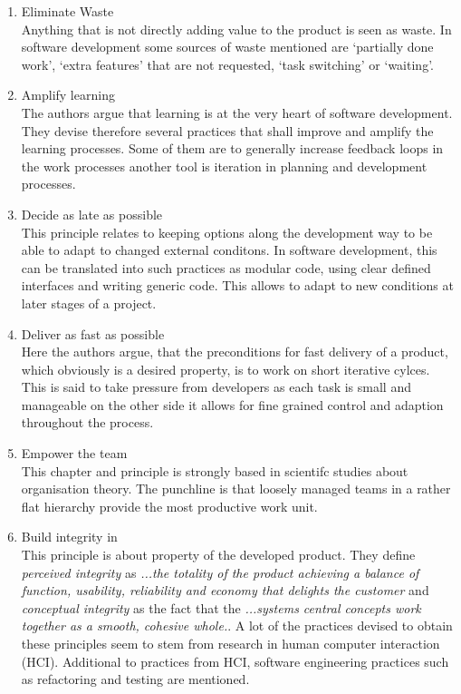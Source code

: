 \documentclass[a4paper,11pt,twoside]{article}
\begin{document}
\begin{enumerate}
\item Eliminate Waste\\
Anything that is not directly adding value to the product is seen as waste. In software development some sources of waste mentioned are `partially done work', `extra features' that are not requested, `task switching' or `waiting'. 

\item Amplify learning\\
The authors argue that learning is at the very heart of software development. They devise therefore several practices that shall improve and amplify the learning processes. Some of them are to generally increase feedback loops in the work processes another tool is iteration in planning and development processes. 

\item Decide as late as possible\\
This principle relates to keeping options along the development way to be able to adapt to changed external conditons. In software development, this can be translated into such practices as modular code, using clear defined interfaces and writing generic code. This allows to adapt to new conditions at later stages of a project.

\item Deliver as fast as possible\\
Here the authors argue, that the preconditions for fast delivery of a product, which obviously is a desired property, is to work on short iterative cylces. This is said to take pressure from developers as each task is small and manageable on the other side it allows for fine grained control and adaption throughout the process.

\item Empower the team\\
This chapter and principle is strongly based in scientifc studies about organisation theory. The punchline is that loosely managed teams in a rather flat hierarchy provide the most productive work unit.  

\item Build integrity in\\
This principle is about property of the developed product. They define \textit{perceived integrity} as \textit{...the totality of the product achieving a balance of function, usability, reliability and economy that delights the customer} and \textit{conceptual integrity} as the fact that the \textit{...systems central concepts work together as a smooth, cohesive whole.}. A lot of the practices devised to obtain these principles seem to stem from research in human computer interaction (HCI). Additional to practices from HCI, software engineering practices such as refactoring and testing are mentioned. 


\end{enumerate}
\end{document}
